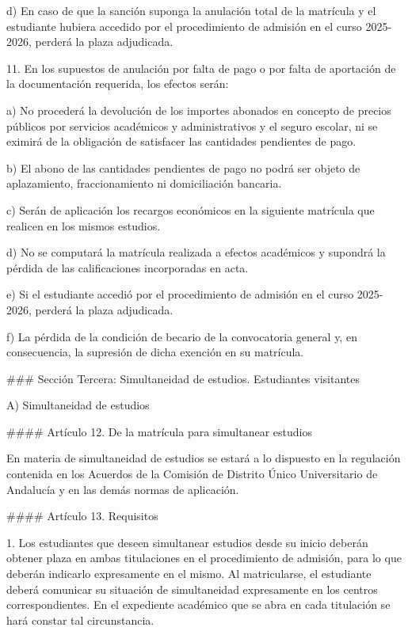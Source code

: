 \documentclass{article}
\begin{document}
\begin{itemize}
\begin{itemize}
\begin{scriptsize}
                  d) En caso de que la sanción suponga la anulación total de la matrícula y el estudiante hubiera accedido por el procedimiento de admisión en el curso 2025-2026, perderá la plaza adjudicada.

                  11. En los supuestos de anulación por falta de pago o por falta de aportación de la documentación requerida, los efectos serán:

                  a) No procederá la devolución de los importes abonados en concepto de precios públicos por servicios académicos y administrativos y el seguro escolar, ni se eximirá de la obligación de satisfacer las cantidades pendientes de pago.

                  b) El abono de las cantidades pendientes de pago no podrá ser objeto de aplazamiento, fraccionamiento ni domiciliación bancaria.

                  c) Serán de aplicación los recargos económicos en la siguiente matrícula que realicen en los mismos estudios.

                  d) No se computará la matrícula realizada a efectos académicos y supondrá la pérdida de las calificaciones incorporadas en acta.

                  e) Si el estudiante accedió por el procedimiento de admisión en el curso 2025-2026, perderá la plaza adjudicada.

                  f) La pérdida de la condición de becario de la convocatoria general y, en consecuencia, la supresión de dicha exención en su matrícula.

                  \#\#\# Sección Tercera: Simultaneidad de estudios. Estudiantes visitantes

                  A) Simultaneidad de estudios

                  \#\#\#\# Artículo 12. De la matrícula para simultanear estudios

                  En materia de simultaneidad de estudios se estará a lo dispuesto en la regulación contenida en los Acuerdos de la Comisión de Distrito Único Universitario de Andalucía y en las demás normas de aplicación.

                  \#\#\#\# Artículo 13. Requisitos

                  1. Los estudiantes que deseen simultanear estudios desde su inicio deberán obtener plaza en ambas titulaciones en el procedimiento de admisión, para lo que deberán indicarlo expresamente en el mismo. Al matricularse, el estudiante deberá comunicar su situación de simultaneidad expresamente en los centros correspondientes. En el expediente académico que se abra en cada titulación se hará constar tal circunstancia.


\end{scriptsize}
\end{itemize}
\end{itemize}
\end{document}
